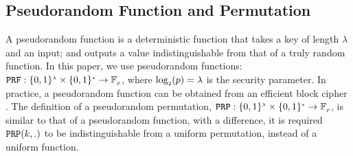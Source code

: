 %

%
\vspace{-3mm}
\subsection{Pseudorandom Function and Permutation}
\vspace{-1mm}

A pseudorandom function is a deterministic function that takes a key of length $\lambda$ and an input; and outputs a value  indistinguishable from that of  a truly random function.  In this paper, we use pseudorandom functions:   $\mathtt {PRF}: \{0,1\}^{\scriptscriptstyle \lambda}\times \{0,1\}^{\scriptscriptstyle *} \rightarrow  \mathbb{F}_{\scriptscriptstyle p}$, where $\log_{\scriptscriptstyle 2}(p)=\lambda$ is the security parameter. In practice, a pseudorandom function can be obtained from an efficient block cipher \cite{DBLP:books/crc/KatzLindell2007}. 
%
The definition of a pseudorandom permutation, $\mathtt {PRP}: \{0,1\}^{\scriptscriptstyle \lambda}\times \{0,1\}^{\scriptscriptstyle *} \rightarrow  \mathbb{F}_{\scriptscriptstyle p}$, is similar to that of a pseudorandom function, with a difference, it is required  $\mathtt{PRP}(k,.)$ to be indistinguishable from a uniform permutation, instead of a uniform function. %





